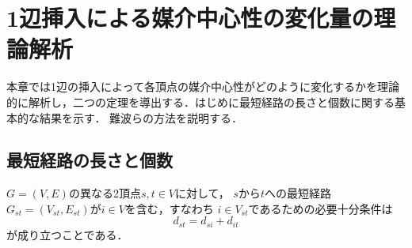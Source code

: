 \chapter{1辺挿入による媒介中心性の変化量の理論解析}
本章では1辺の挿入によって各頂点の媒介中心性がどのように変化するかを理論的に解析し，二つの定理を導出する．はじめに最短経路の長さと個数に関する基本的な結果を示す．
難波らの方法\cite{Nanba2016}を説明する．
\section{最短経路の長さと個数}
\begin{lemma}
\rm 
$G=(V,E)$の異なる2頂点$s,t \in V$に対して，
$s$から$t$への最短経路$G_{st}=(V_{st},E_{st})$が$i \in V$を含む，すなわち
$i \in V_{st}$であるための必要十分条件は
\begin{equation*}
d_{st}=d_{si}+d_{it}
\end{equation*}
が成り立つことである．
\label{lemma:1}
\end{lemma}

